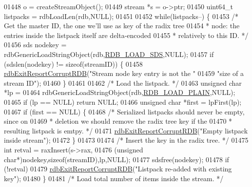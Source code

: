 \begin{DoxyCode}
{{{{{{{{{{{{{{{{{{{{{{{{01448         o = createStreamObject();
01449         stream *s = o->ptr;
01450         uint64\_t listpacks = rdbLoadLen(rdb,NULL);
01451 
01452         \textcolor{keywordflow}{while}(listpacks--) \{
01453             \textcolor{comment}{/* Get the master ID, the one we'll use as key of the radix tree}
01454 \textcolor{comment}{             * node: the entries inside the listpack itself are delta-encoded}
01455 \textcolor{comment}{             * relatively to this ID. */}
01456             sds nodekey = rdbGenericLoadStringObject(rdb,\hyperlink{rdb_8h_ad15f5cc8e1a7789cc35b66f017e98a18}{RDB\_LOAD\_SDS},NULL);
01457             \textcolor{keywordflow}{if} (sdslen(nodekey) != \textcolor{keyword}{sizeof}(streamID)) \{
01458                 \hyperlink{rdb_8c_afb34e310c0e5dfd9f8c2bebbec59c7f7}{rdbExitReportCorruptRDB}(\textcolor{stringliteral}{"Stream node key entry is not the "}
01459                                         \textcolor{stringliteral}{"size of a stream ID"});
01460             \}
01461 
01462             \textcolor{comment}{/* Load the listpack. */}
01463             \textcolor{keywordtype}{unsigned} \textcolor{keywordtype}{char} *lp =
01464                 rdbGenericLoadStringObject(rdb,\hyperlink{rdb_8h_a5579c0ff24afa891ad41006def040a25}{RDB\_LOAD\_PLAIN},NULL);
01465             \textcolor{keywordflow}{if} (lp == NULL) \textcolor{keywordflow}{return} NULL;
01466             \textcolor{keywordtype}{unsigned} \textcolor{keywordtype}{char} *first = lpFirst(lp);
01467             \textcolor{keywordflow}{if} (first == NULL) \{
01468                 \textcolor{comment}{/* Serialized listpacks should never be empty, since on}
01469 \textcolor{comment}{                 * deletion we should remove the radix tree key if the}
01470 \textcolor{comment}{                 * resulting listpack is emtpy. */}
01471                 \hyperlink{rdb_8c_afb34e310c0e5dfd9f8c2bebbec59c7f7}{rdbExitReportCorruptRDB}(\textcolor{stringliteral}{"Empty listpack inside stream"});
01472             \}
01473 
01474             \textcolor{comment}{/* Insert the key in the radix tree. */}
01475             \textcolor{keywordtype}{int} retval = raxInsert(s->rax,
01476                 (\textcolor{keywordtype}{unsigned} \textcolor{keywordtype}{char}*)nodekey,\textcolor{keyword}{sizeof}(streamID),lp,NULL);
01477             sdsfree(nodekey);
01478             \textcolor{keywordflow}{if} (!retval)
01479                 \hyperlink{rdb_8c_afb34e310c0e5dfd9f8c2bebbec59c7f7}{rdbExitReportCorruptRDB}(\textcolor{stringliteral}{"Listpack re-added with existing key"});
01480         \}
01481         \textcolor{comment}{/* Load total number of items inside the stream. */}
}}}}}}}}}}}}}}}}}}}}}}}}
\end{DoxyCode}
